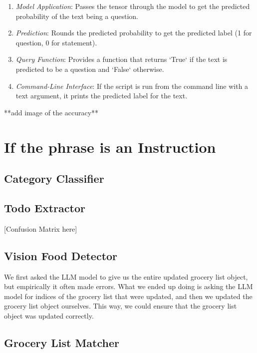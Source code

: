 \documentclass{article}
\begin{document}
\begin{itemize}
\begin{enumerate}
    \item \textit{Model Application}: Passes the tensor through the model to get the predicted probability of the text being a question.
    \item \textit{Prediction}: Rounds the predicted probability to get the predicted label (1 for question, 0 for statement).
    \item \textit{Query Function}: Provides a function that returns `True` if the text is predicted to be a question and `False` otherwise.
    \item \textit{Command-Line Interface}: If the script is run from the command line with a text argument, it prints the predicted label for the text.
  \end{enumerate}
\end{itemize}

**add image of the accuracy**

\section*{If the phrase is an Instruction}
\subsection*{\color{draculayellow}Category Classifier}

\subsection*{\color{draculayellow}Todo Extractor}

[Confusion Matrix here]

\subsection*{\color{draculayellow}Vision Food Detector}

We first asked the LLM model to give us the entire updated grocery list object, but empirically it often made errors. What we ended up doing is asking the LLM model for indices of the grocery list that were updated, and then we updated the grocery list object ourselves. This way, we could ensure that the grocery list object was updated correctly.

\subsection*{\color{draculayellow}Grocery List Matcher}
\end{document}

